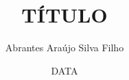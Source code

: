 \documentclass[pdftex, brazil, 12pt, twoside]{article}
\begin{document}
\title{TÍTULO}
\author{Abrantes Araújo Silva Filho}
\date{DATA}
\maketitle


\tableofcontents





%




\printindex


\end{document}
